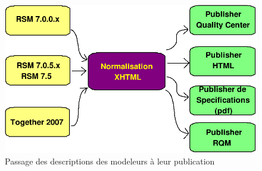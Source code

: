 \begin{figure}[!ht]
\centering
\includegraphics[scale=0.5]{Illustrations/bigDescSchema.png}
\caption{Passage des descriptions des modeleurs à leur publication}
\label{figure:descXHTMLPublisher}
\end{figure}
